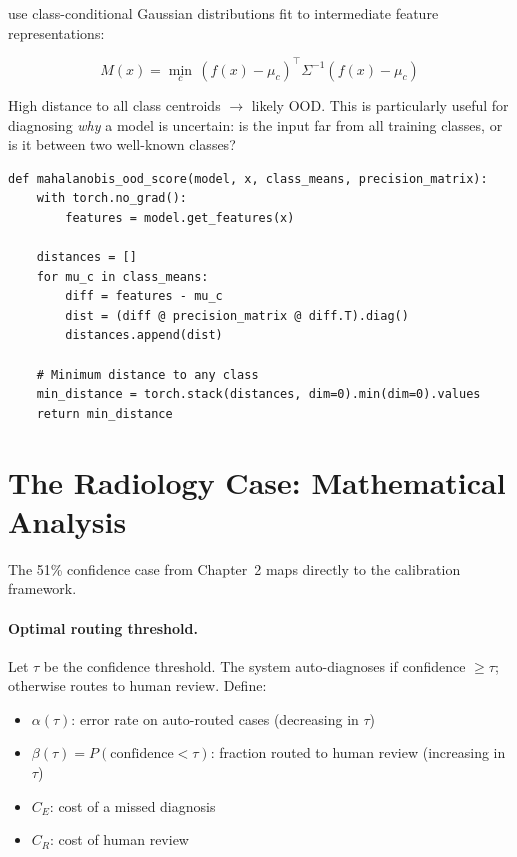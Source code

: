 \textcite{lee2018simple} use class-conditional Gaussian distributions fit to intermediate feature representations:

\[
M(x) = \min_c \, (f(x) - \mu_c)^\top \Sigma^{-1}(f(x) - \mu_c)
\]

High distance to all class centroids $\to$ likely OOD. This is particularly useful for diagnosing \emph{why} a model is uncertain: is the input far from all training classes, or is it between two well-known classes?

\begin{lstlisting}[style=python, caption={Mahalanobis distance OOD scoring}]
def mahalanobis_ood_score(model, x, class_means, precision_matrix):
    with torch.no_grad():
        features = model.get_features(x)

    distances = []
    for mu_c in class_means:
        diff = features - mu_c
        dist = (diff @ precision_matrix @ diff.T).diag()
        distances.append(dist)

    # Minimum distance to any class
    min_distance = torch.stack(distances, dim=0).min(dim=0).values
    return min_distance
\end{lstlisting}

\section{The Radiology Case: Mathematical Analysis}

The 51\% confidence case from Chapter~2 maps directly to the calibration framework.

\paragraph{Optimal routing threshold.}

Let $\tau$ be the confidence threshold. The system auto-diagnoses if confidence $\geq \tau$; otherwise routes to human review. Define:
\begin{itemize}
    \item $\alpha(\tau)$: error rate on auto-routed cases (decreasing in $\tau$)
    \item $\beta(\tau) = P(\text{confidence} < \tau)$: fraction routed to human review (increasing in $\tau$)
    \item $C_E$: cost of a missed diagnosis
    \item $C_R$: cost of human review
\end{itemize}

